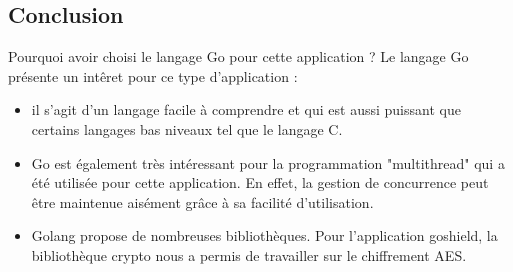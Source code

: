 \documentclass{beamer}
\begin{document}
\subsection{Conclusion}

\begin{frame}
\begin{block}{Pourquoi avoir choisi le langage Go pour cette application ?} 
	Le langage Go présente un intêret pour ce type d'application :
	\begin{itemize}
		[circle]
		
		\item il s'agit d'un langage facile à comprendre et qui est aussi puissant que certains langages bas niveaux tel que le langage C.
		\item Go est également très intéressant pour la programmation "multithread" qui a été utilisée pour cette application. En effet, la gestion de concurrence peut être maintenue aisément grâce à sa facilité d'utilisation. 
		\item Golang propose de nombreuses bibliothèques. Pour l'application goshield, la bibliothèque crypto nous a permis de travailler sur le chiffrement AES. 
	\end{itemize}
	
\end{block}
\end{frame}
      
\end{document}
